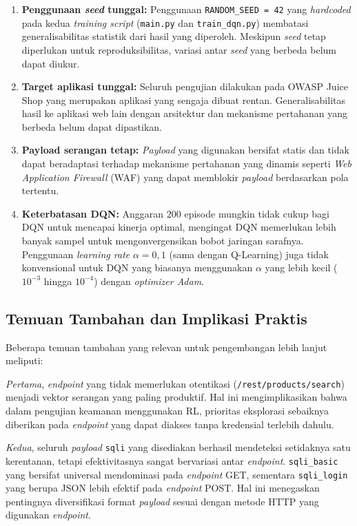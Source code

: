 \begin{enumerate}
    \item \textbf{Penggunaan \textit{seed} tunggal:} Penggunaan \texttt{RANDOM\_SEED = 42} yang \textit{hardcoded} pada kedua \textit{training script} (\texttt{main.py} dan \texttt{train\_dqn.py}) membatasi generalisabilitas statistik dari hasil yang diperoleh. Meskipun \textit{seed} tetap diperlukan untuk reproduksibilitas, variasi antar \textit{seed} yang berbeda belum dapat diukur.

    \item \textbf{Target aplikasi tunggal:} Seluruh pengujian dilakukan pada OWASP Juice Shop yang merupakan aplikasi yang sengaja dibuat rentan. Generalisabilitas hasil ke aplikasi web lain dengan arsitektur dan mekanisme pertahanan yang berbeda belum dapat dipastikan.

    \item \textbf{Payload serangan tetap:} \textit{Payload} yang digunakan bersifat statis dan tidak dapat beradaptasi terhadap mekanisme pertahanan yang dinamis seperti \textit{Web Application Firewall} (WAF) yang dapat memblokir \textit{payload} berdasarkan pola tertentu.

    \item \textbf{Keterbatasan DQN:} Anggaran 200 episode mungkin tidak cukup bagi DQN untuk mencapai kinerja optimal, mengingat DQN memerlukan lebih banyak sampel untuk mengonvergensikan bobot jaringan sarafnya. Penggunaan \textit{learning rate} $\alpha = 0,1$ (sama dengan Q-Learning) juga tidak konvensional untuk DQN yang biasanya menggunakan $\alpha$ yang lebih kecil ($10^{-3}$ hingga $10^{-4}$) dengan \textit{optimizer Adam}.
\end{enumerate}

\subsection{Temuan Tambahan dan Implikasi Praktis}

Beberapa temuan tambahan yang relevan untuk pengembangan lebih lanjut meliputi:

\textit{Pertama}, \textit{endpoint} yang tidak memerlukan otentikasi (\texttt{/rest/products/search}) menjadi vektor serangan yang paling produktif. Hal ini mengimplikasikan bahwa dalam pengujian keamanan menggunakan RL, prioritas eksplorasi sebaiknya diberikan pada \textit{endpoint} yang dapat diakses tanpa kredensial terlebih dahulu.

\textit{Kedua}, seluruh \textit{payload} \texttt{sqli} yang disediakan berhasil mendeteksi setidaknya satu kerentanan, tetapi efektivitasnya sangat bervariasi antar \textit{endpoint}. \texttt{sqli\_basic} yang bersifat universal mendominasi pada \textit{endpoint} GET, sementara \texttt{sqli\_login} yang berupa JSON lebih efektif pada \textit{endpoint} POST. Hal ini menegaskan pentingnya diversifikasi format \textit{payload} sesuai dengan metode HTTP yang digunakan \textit{endpoint}.

